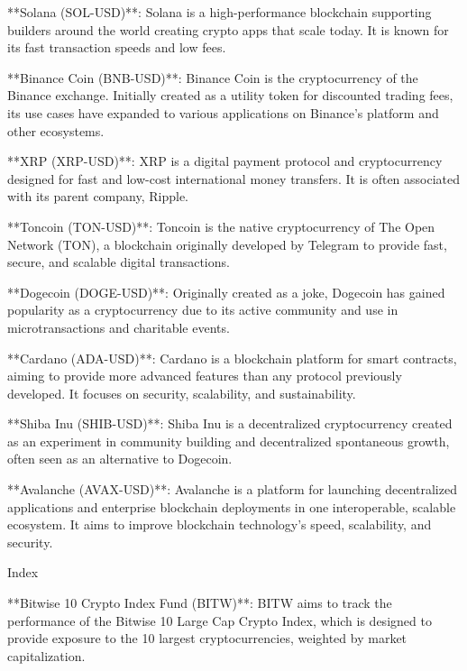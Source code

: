 **Solana (SOL-USD)**: Solana is a high-performance blockchain supporting builders around the world creating crypto apps that scale today. It is known for its fast transaction speeds and low fees.

**Binance Coin (BNB-USD)**: Binance Coin is the cryptocurrency of the Binance exchange. Initially created as a utility token for discounted trading fees, its use cases have expanded to various applications on Binance's platform and other ecosystems.

**XRP (XRP-USD)**: XRP is a digital payment protocol and cryptocurrency designed for fast and low-cost international money transfers. It is often associated with its parent company, Ripple.

**Toncoin (TON-USD)**: Toncoin is the native cryptocurrency of The Open Network (TON), a blockchain originally developed by Telegram to provide fast, secure, and scalable digital transactions.

**Dogecoin (DOGE-USD)**: Originally created as a joke, Dogecoin has gained popularity as a cryptocurrency due to its active community and use in microtransactions and charitable events.

**Cardano (ADA-USD)**: Cardano is a blockchain platform for smart contracts, aiming to provide more advanced features than any protocol previously developed. It focuses on security, scalability, and sustainability.

**Shiba Inu (SHIB-USD)**: Shiba Inu is a decentralized cryptocurrency created as an experiment in community building and decentralized spontaneous growth, often seen as an alternative to Dogecoin.

**Avalanche (AVAX-USD)**: Avalanche is a platform for launching decentralized applications and enterprise blockchain deployments in one interoperable, scalable ecosystem. It aims to improve blockchain technology’s speed, scalability, and security.

Index

**Bitwise 10 Crypto Index Fund (BITW)**: BITW aims to track the performance of the Bitwise 10 Large Cap Crypto Index, which is designed to provide exposure to the 10 largest cryptocurrencies, weighted by market capitalization.